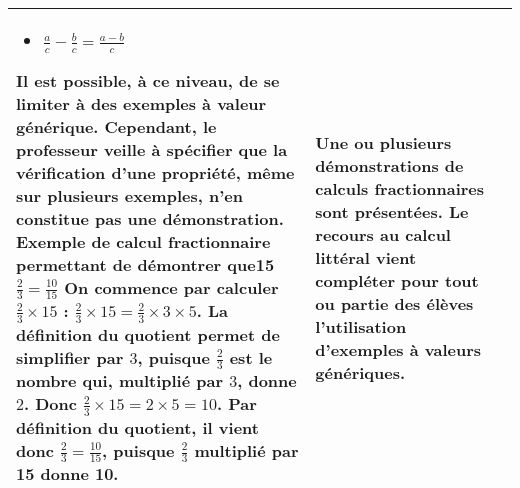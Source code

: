 \documentclass[11pt]{article}
\newenvironment{programme}
{
    \setlength{\arrayrulewidth}{0.5pt}
    \arrayrulecolor{bleu}
    \begin{center}
    \begin{tabular}{|p{6.4cm}|p{6.4cm}|p{6.4cm}|}
}
{
    \hline
    \end{tabular}
    \end{center}
}
\begin{document}
\begin{programme}
\begin{multicols}{2}
\begin{itemize}
        \item $\frac{a}{c} - \frac{b}{c} = \frac{a-b}{c}$
    \end{itemize}
    \end{multicols}
    Il est possible, à ce niveau, de se limiter à des exemples à valeur générique. Cependant, le professeur veille à spécifier que la vérification d’une propriété, même sur plusieurs exemples, n’en constitue pas une démonstration. Exemple de calcul fractionnaire permettant de démontrer que15 $\frac{2}{3} = \frac{10}{15}$
    On commence par calculer $\frac{2}{3} \times 15$ : $\frac{2}{3} \times 15 = \frac{2}{3} \times 3 \times 5$.
    La définition du quotient permet de simplifier par $3$, puisque $\frac{2}{3}$ est le nombre qui, multiplié par $3$, donne $2$. Donc $\frac{2}{3} \times 15 = 2 \times 5 = 10$. Par définition du quotient, il vient donc $\frac{2}{3} = \frac{10}{15}$, puisque $\frac{2}{3}$ multiplié par 15 donne 10. & Une ou plusieurs démonstrations de calculs fractionnaires sont présentées. Le recours au calcul littéral vient compléter pour tout ou partie des élèves l’utilisation d’exemples à valeurs génériques. & \\
\end{programme}
\end{document}
